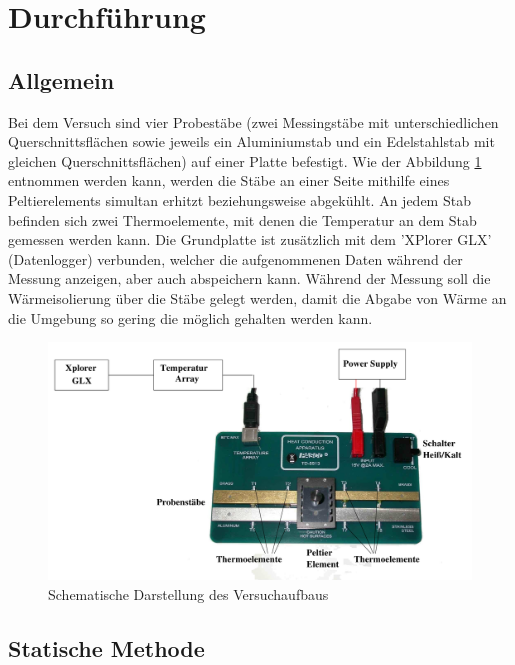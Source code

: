 \section{Durchführung}
\label{sec:Durchführung}

\subsection{Allgemein}

Bei dem Versuch sind vier Probestäbe (zwei Messingstäbe mit unterschiedlichen 
Querschnittsflächen sowie jeweils ein Aluminiumstab und ein Edelstahlstab mit gleichen 
Querschnittsflächen) auf einer Platte befestigt. Wie der Abbildung \ref{fig:durchfuehrungbild1}
entnommen werden kann, werden die Stäbe an einer Seite mithilfe eines Peltierelements 
simultan erhitzt beziehungsweise abgekühlt. An jedem Stab befinden sich zwei Thermoelemente,
mit denen die Temperatur an dem Stab gemessen werden kann. Die Grundplatte ist zusätzlich mit 
dem 'XPlorer GLX' (Datenlogger) verbunden, welcher die aufgenommenen
Daten während der Messung anzeigen, aber auch abspeichern kann. Während der Messung soll die 
Wärmeisolierung über die Stäbe gelegt werden, damit die Abgabe von Wärme an die Umgebung so 
gering die möglich gehalten werden kann. 


\begin{figure}[H]
    \centering
    \includegraphics[width=13cm]{content/durchfuehrung1.png}
    
    \caption{Schematische Darstellung des Versuchaufbaus \cite{sample}}
    \label{fig:durchfuehrungbild1}
\end{figure}


\subsection{Statische Methode}


